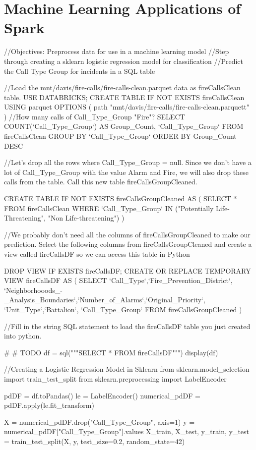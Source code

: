 \documentclass[12pt]{article}
\begin{document}
\section{Machine Learning Applications of Spark}
\begin{code}
//Objectives: Preprocess data for use in a machine learning model
//Step through creating a sklearn logistic regression model for classification
//Predict the Call Type Group for incidents in a SQL table

//Load the mnt/davis/fire-calls/fire-calls-clean.parquet data as fireCallsClean table.
USE DATABRICKS;
CREATE TABLE IF NOT EXISTS fireCallsClean
USING parquet
OPTIONS (
  path "mnt/davis/fire-calls/fire-calls-clean.parquett"
)
//How many calls of Call_Type_Group "Fire"?
SELECT COUNT(`Call_Type_Group`) AS Group_Count, `Call_Type_Group`
FROM fireCallsClean
GROUP BY `Call_Type_Group`
ORDER BY Group_Count DESC

//Let's drop all the rows where Call_Type_Group = null. Since we don't have a lot of Call_Type_Group with the value Alarm and Fire, we will also drop these calls from the table. Call this new table fireCallsGroupCleaned.

CREATE TABLE IF NOT EXISTS fireCallsGroupCleaned AS (
  SELECT *
  FROM fireCallsClean
  WHERE `Call_Type_Group` IN ("Potentially Life-Threatening", "Non Life-threatening")
)

//We probably don't need all the columns of fireCallsGroupCleaned to make our prediction. Select the following columns from fireCallsGroupCleaned and create a view called fireCallsDF so we can access this table in Python

DROP VIEW IF EXISTS fireCallsDF;
CREATE OR REPLACE TEMPORARY VIEW fireCallsDF AS (
SELECT `Call_Type`,`Fire_Prevention_District`, `Neighborhooods_-_Analysis_Boundaries`,`Number_of_Alarms`,`Original_Priority`,
`Unit_Type`,`Battalion`, `Call_Type_Group`
FROM fireCallsGroupCleaned
)

//Fill in the string SQL statement to load the fireCallsDF table you just created into python.

# # TODO
df = sql("""SELECT * FROM fireCallsDF""")
display(df)

//Creating a Logistic Regression Model in Sklearn
from sklearn.model_selection import train_test_split
from sklearn.preprocessing import LabelEncoder

pdDF = df.toPandas()
le = LabelEncoder()
numerical_pdDF = pdDF.apply(le.fit_transform)

X = numerical_pdDF.drop("Call_Type_Group", axis=1)
y = numerical_pdDF["Call_Type_Group"].values
X_train, X_test, y_train, y_test = train_test_split(X, y, test_size=0.2, random_state=42)


\end{code}
\end{document}
